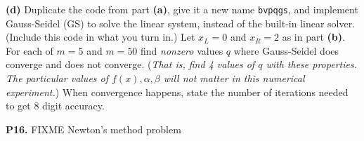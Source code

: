 \documentclass[12pt]{amsart}
\newcommand{\prob}[1]{\bigskip\noindent\textbf{#1.}\quad }
\newcommand{\epart}[1]{\medskip\noindent\textbf{(#1)}\quad }
\begin{document}
\epart{d}  Duplicate the code from part \textbf{(a)}, give it a new name \texttt{bvpqgs}, and implement Gauss-Seidel (GS) to solve the linear system, instead of the built-in linear solver.  (Include this code in what you turn in.)  Let $x_L=0$ and $x_R=2$ as in part \textbf{(b)}.  For each of $m=5$ and $m=50$ find \emph{nonzero} values $q$ where Gauss-Seidel does converge and does not converge.  (\emph{That is, find 4 values of $q$ with these properties.  The particular values of $f(x),\alpha,\beta$ will not matter in this numerical experiment.})  When convergence happens, state the number of iterations needed to get 8 digit accuracy.


\prob{P16}  FIXME Newton's method problem
\end{document}

